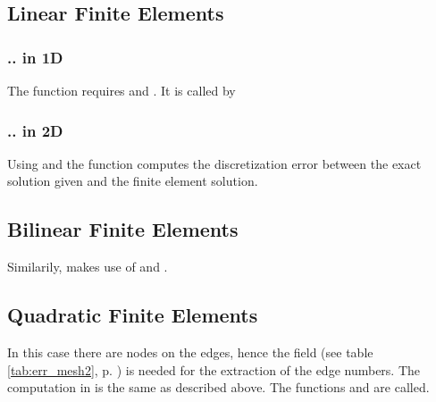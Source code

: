 
\subsection{Linear Finite Elements}  

\subsubsection{.. in 1D}

 The function requires  and . It is called by \\


\subsubsection{.. in 2D}

 Using  and  the function  computes the discretization error between the exact solution given and the finite element solution.



\subsection{Bilinear Finite Elements}  

 Similarily,  makes use of  and .



\subsection{Quadratic Finite Elements}  \label{ssect:h1err_qfe}

 In this case there are nodes on the edges, hence the field  (see table \ref{tab:err_mesh2}, p. \pageref{tab:err_mesh2}) is needed for the extraction of the edge numbers. The computation in  is the same as described above. The functions  and  are called. \\

